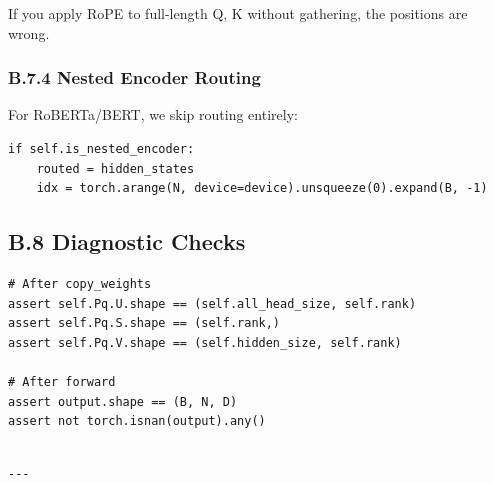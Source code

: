 If you apply RoPE to full-length Q, K without gathering, the positions 
are wrong.

\subsubsection{B.7.4 Nested Encoder Routing}

For RoBERTa/BERT, we skip routing entirely:

\begin{lstlisting}
if self.is_nested_encoder:
    routed = hidden_states
    idx = torch.arange(N, device=device).unsqueeze(0).expand(B, -1)
\end{lstlisting}

\subsection{B.8 Diagnostic Checks}

\begin{lstlisting}
# After copy_weights
assert self.Pq.U.shape == (self.all_head_size, self.rank)
assert self.Pq.S.shape == (self.rank,)
assert self.Pq.V.shape == (self.hidden_size, self.rank)

# After forward
assert output.shape == (B, N, D)
assert not torch.isnan(output).any()
\end{lstlisting}
\begin{lstlisting}

---
\end{lstlisting}